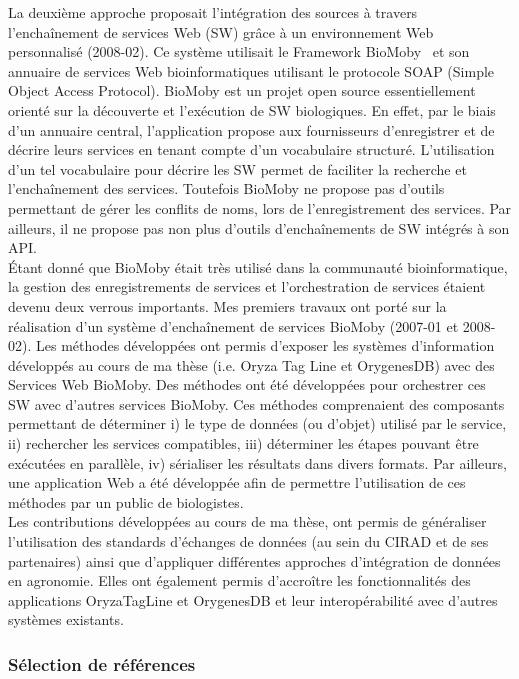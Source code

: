 La deuxième approche proposait l’intégration des sources à travers l’enchaînement de services Web (SW) grâce à un environnement Web personnalisé (2008-02). Ce système utilisait le Framework BioMoby~\cite{Wilkinson2002a,Wilkinson2005a}  et son annuaire de services Web bioinformatiques utilisant le protocole SOAP  (Simple Object Access Protocol). BioMoby est un projet open source essentiellement orienté sur la découverte et l’exécution de SW biologiques. En effet, par le biais d’un annuaire central, l’application propose aux fournisseurs d’enregistrer et de décrire leurs services en tenant compte d’un vocabulaire structuré. L’utilisation d’un tel vocabulaire pour décrire les SW permet de faciliter la recherche et l’enchaînement des services. Toutefois BioMoby ne propose pas d’outils permettant de gérer les conflits de noms, lors de l'enregistrement des services. Par ailleurs, il ne propose pas non plus d'outils d’enchaînements de SW intégrés à son API. \\
Étant donné que BioMoby était très utilisé dans la communauté bioinformatique, la gestion des enregistrements de services et l'orchestration de services étaient devenu deux verrous importants. Mes premiers travaux ont porté sur la réalisation d'un système d'enchaînement de services BioMoby (2007-01 et 2008-02). Les méthodes développées ont permis d'exposer les systèmes d'information développés au cours de ma thèse (i.e. Oryza Tag Line et OrygenesDB) avec des Services Web BioMoby. Des méthodes ont été développées pour orchestrer ces SW avec d'autres services BioMoby. Ces méthodes comprenaient des composants permettant de déterminer i) le type de données (ou d'objet) utilisé par le service, ii) rechercher les services compatibles, iii) déterminer les étapes pouvant être exécutées en parallèle,  iv) sérialiser les résultats dans divers formats. Par ailleurs, une application Web a été développée afin de permettre l'utilisation de ces méthodes par un public de biologistes. \\

Les contributions développées au cours de ma thèse, ont permis de généraliser l’utilisation des standards d’échanges de données (au sein du CIRAD et de ses partenaires) ainsi que d’appliquer différentes approches d’intégration de données en agronomie. Elles ont également permis d’accroître les fonctionnalités des applications OryzaTagLine et OrygenesDB et leur interopérabilité avec d’autres systèmes existants.

\subsubsection*{Sélection de références}

